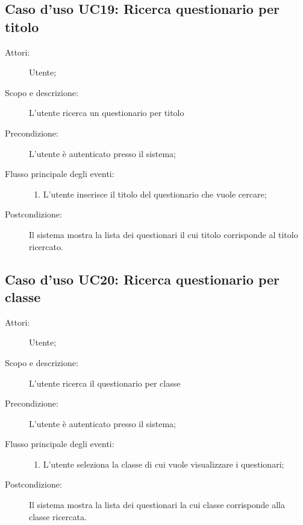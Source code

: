 \subsection{Caso d'uso UC19: Ricerca questionario per titolo}\begin{description}
\item[Attori:] Utente;
\item[Scopo e descrizione:] L'utente ricerca un questionario per titolo
      \item[Precondizione:] L'utente è autenticato presso il sistema;

        \item[Flusso principale degli eventi:] \begin{enumerate}
          \item L'utente inserisce il titolo del questionario che vuole cercare;

      \end{enumerate}
    \item[Postcondizione:] Il sistema mostra la lista dei questionari il cui titolo corrisponde al titolo ricercato.
  \end{description}
\hypertarget{UC20}{}
\subsection{Caso d'uso UC20: Ricerca questionario per classe}\begin{description}
\item[Attori:] Utente;
\item[Scopo e descrizione:] L'utente ricerca il questionario per classe
      \item[Precondizione:] L'utente è autenticato presso il sistema;

        \item[Flusso principale degli eventi:] \begin{enumerate}
          \item L'utente seleziona la classe di cui vuole visualizzare i questionari;

      \end{enumerate}
    \item[Postcondizione:] Il sistema mostra la lista dei questionari la cui classe corrisponde alla classe ricercata.
  \end{description}
\hypertarget{UC21}{}

